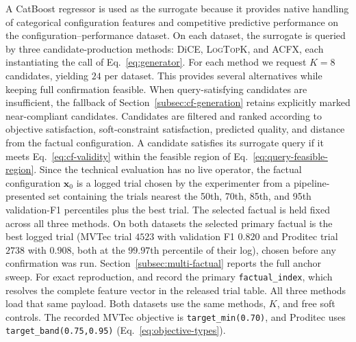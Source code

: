 \documentclass[final,5p,times,twocolumn]{elsarticle}
\begin{document}
A CatBoost regressor \cite{prokhorenkova_catboost_2018} is used as the surrogate because it provides
native handling of categorical configuration features and competitive
predictive performance on the configuration--performance dataset. On
each dataset, the surrogate is queried by three candidate-production
methods: DiCE, \textsc{LogTopK}, and ACFX, each instantiating the call of Eq.~\ref{eq:generator}. For each method
we request $K = 8$ candidates, yielding $24$ per dataset. This provides
several alternatives while keeping full confirmation feasible. When
query-satisfying candidates are insufficient, the fallback of
Section~\ref{subsec:cf-generation} retains explicitly marked
near-compliant candidates.
Candidates are filtered and ranked according to objective satisfaction,
soft-constraint satisfaction, predicted quality, and distance from the
factual configuration. A candidate satisfies its surrogate query if it meets
Eq.~\ref{eq:cf-validity} within the feasible region of
Eq.~\ref{eq:query-feasible-region}.
Since the technical evaluation has no live operator, the factual
configuration $\mathbf{x}_0$ is a logged trial chosen by the
experimenter from a pipeline-presented set containing the trials
nearest the 50th, 70th, 85th, and 95th validation-F1 percentiles plus
the best trial. The selected factual is held fixed across all three
methods. On both datasets the selected primary factual is the best
logged trial (MVTec trial $4523$ with validation F1 $0.820$ and Proditec trial $2738$ with $0.908$, both at the $99.97$th percentile of their log), chosen before any confirmation was run. Section~\ref{subsec:multi-factual} reports the full anchor sweep. For exact reproduction,
 and
 record the primary
\texttt{factual\_index}, which resolves the complete feature vector in the released trial table. All three methods load that same payload.
Both datasets use the same methods, $K$, and free soft controls. The
recorded MVTec objective is \texttt{target\_min(0.70)}, and Proditec uses
\texttt{target\_band(0.75,0.95)} (Eq.~\ref{eq:objective-types}).
\end{document}
